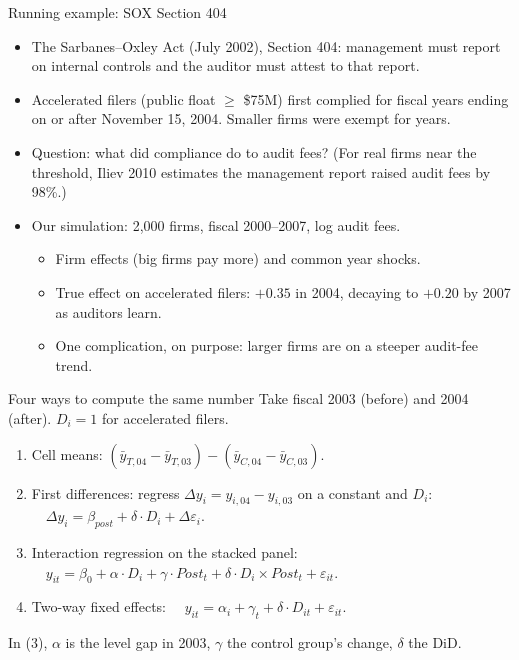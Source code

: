 \documentclass[aspectratio=169,11pt]{beamer}
\begin{document}
\begin{frame}{Running example: SOX Section 404}
\begin{itemize}
	\item The Sarbanes--Oxley Act (July 2002), Section 404: management must report on internal
	controls and the auditor must attest to that report.
	\medskip
	\item \alert{Accelerated filers} (public float $\ge$ \$75M) first complied for fiscal years ending on or
	after November 15, 2004. Smaller firms were exempt for years.
	\medskip
	\item Question: what did compliance do to audit fees? (For real firms near the threshold, Iliev 2010
	estimates the management report raised audit fees by 98\%.)
	\medskip
	\item \alert{Our simulation:} 2,000 firms, fiscal 2000--2007, log audit fees.
	\begin{itemize}
		\item Firm effects (big firms pay more) and common year shocks.
		\item True effect on accelerated filers: $+0.35$ in 2004, decaying to $+0.20$ by 2007 as auditors learn.
		\item One complication, on purpose: larger firms are on a steeper audit-fee trend.
	\end{itemize}
\end{itemize}
\end{frame}


\begin{frame}{Four ways to compute the same number}
\small
Take fiscal 2003 (before) and 2004 (after). $D_i = 1$ for accelerated filers.
\begin{enumerate}
	\item \alert{Cell means}: $(\bar y_{T,04} - \bar y_{T,03}) - (\bar y_{C,04} - \bar y_{C,03})$.
	\item \alert{First differences}: regress $\Delta y_i = y_{i,04} - y_{i,03}$ on a constant and $D_i$:
	$\quad \Delta y_i = \beta_{post} + \delta \cdot D_i + \Delta\varepsilon_i$.
	\item \alert{Interaction regression} on the stacked panel:
	$\quad y_{it} = \beta_0 + \alpha \cdot D_i + \gamma \cdot Post_t + \delta \cdot D_i \times Post_t + \varepsilon_{it}$.
	\item \alert{Two-way fixed effects}:
	$\quad y_{it} = \alpha_i + \gamma_t + \delta \cdot D_{it} + \varepsilon_{it}$.
\end{enumerate}
\medskip
In (3), $\alpha$ is the level gap in 2003, $\gamma$ the control group's change, $\delta$ the DiD.
\medskip
\begin{center}
\scriptsize

\end{center}
\end{frame}
\end{document}
